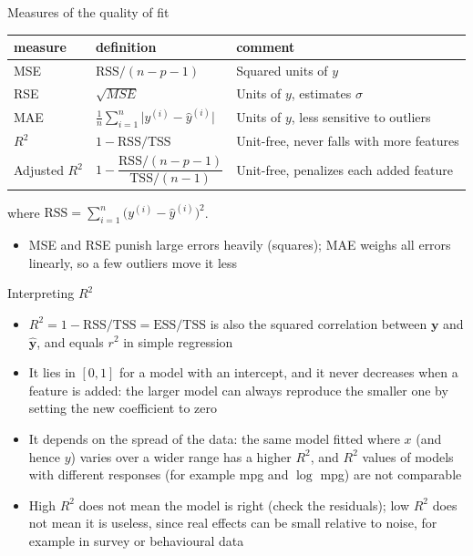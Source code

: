 \begin{frame}{Measures of the quality of fit}
    \begin{center}
        \footnotesize
        \renewcommand{\arraystretch}{1.05}
        \begin{tabular}{lll}
            \toprule
            measure & definition & comment \\
            \midrule
            MSE & $\mathrm{RSS}/(n-p-1)$ & Squared units of $y$ \\
            RSE & $\sqrt{MSE}$ & Units of $y$, estimates $\sigma$ \\
            MAE & $\frac{1}{n} \sum_{i=1}^{n} \big|y^{(i)} - \hat{y}^{(i)}\big|$ & Units of $y$, less sensitive to outliers \\
            $R^2$ & $1 - \mathrm{RSS}/\mathrm{TSS}$ & Unit-free, never falls with more features \\
            Adjusted $R^2$ & $1 - \dfrac{\mathrm{RSS}/(n-p-1)}{\mathrm{TSS}/(n-1)}$ & Unit-free, penalizes each added feature \\
            \bottomrule
        \end{tabular}
    \end{center}
    where \(\mathrm{RSS} = \sum_{i=1}^{n} \big(y^{(i)} - \hat{y}^{(i)}\big)^2\).
    \begin{itemize}
        \item MSE and RSE punish large errors heavily (squares); MAE weighs all errors linearly, so a few outliers move it less
    \end{itemize}
\end{frame}


\begin{frame}{Interpreting $R^2$}
    \begin{itemize}
        \item $R^2 = 1 - \mathrm{RSS}/\mathrm{TSS} = \mathrm{ESS}/\mathrm{TSS}$ is also the squared correlation between $\mathbf{y}$ and $\hat{\mathbf{y}}$, and equals $r^2$ in simple regression
        \item It lies in $[0, 1]$ for a model with an intercept, and it never decreases when a feature is added: the larger model can always reproduce the smaller one by setting the new coefficient to zero
        \item It depends on the spread of the data: the same model fitted where $x$ (and hence $y$) varies over a wider range has a higher $R^2$, and $R^2$ values of models with different responses (for example mpg and $\log$ mpg) are not comparable
        \item High $R^2$ does not mean the model is right (check the residuals); low $R^2$ does not mean it is useless, since real effects can be small relative to noise, for example in survey or behavioural data
    \end{itemize}
\end{frame}


